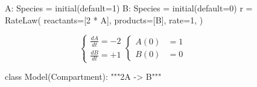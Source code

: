 \documentclass[namedate,numsec,webpdf,modern,large]{oup-authoring-template}
\theoremstyle{thmstyleone}%
\theoremstyle{thmstyletwo}%
\theoremstyle{thmstylethree}%
\newenvironment{CodeInput}{\begin{tcolorbox}[title=input,boxrule=0pt]}{\end{tcolorbox}}
\newcommand{\KeywordTok}[1]{\textcolor[rgb]{0.00,0.13,1.00}{#1}}
\newcommand{\ClassTok}[1]{\textcolor[rgb]{0.27,0.56,0.65}{#1}}
\newcommand{\OperatorTok}[1]{\textcolor[rgb]{0.00,0.00,0.00}{#1}}
\newcommand{\VariableTok}[1]{\textcolor[rgb]{0.00,0.06,0.50}{#1}}
\newcommand{\ValueTok}[1]{\textcolor[rgb]{0.13,0.57,0.41}{#1}}
\newcommand{\FunctionTok}[1]{\textcolor[rgb]{0.47,0.37,0.15}{#1}}
\newcommand{\NormalTok}[1]{\textcolor[rgb]{0.00,0.06,0.50}{#1}}
\newcommand{\CommentTok}[1]{\textcolor[rgb]{0.00,0.50,0.00}{#1}}
\begin{document}
\begin{figure}[t]
\begin{minipage}[t]{\linewidth}
\begin{minipage}[c]{0.60\linewidth}
\begin{CodeInput}
\begin{Highlighting}[]
        \VariableTok{    A}: \ClassTok{Species }\OperatorTok{=}\FunctionTok{ initial}\KeywordTok{(}\VariableTok{default}\OperatorTok{=}\ValueTok{1}\KeywordTok{)}
        \VariableTok{    B}: \ClassTok{Species }\OperatorTok{=}\FunctionTok{ initial}\KeywordTok{(}\VariableTok{default}\OperatorTok{=}\ValueTok{0}\KeywordTok{)}
        \VariableTok{    r }\OperatorTok{=}\ClassTok{ RateLaw}\KeywordTok{(}
        \VariableTok{        reactants}\OperatorTok{=}\KeywordTok{[}\ValueTok{2} \OperatorTok{*}\VariableTok{ A}\KeywordTok{]},
        \VariableTok{        products}\OperatorTok{=}\NormalTok{\KeywordTok{[}B\KeywordTok{]},}
        \VariableTok{        rate}\OperatorTok{=}\ValueTok{1}\NormalTok{,}
        \KeywordTok{    )}
      \end{Highlighting}
      \end{CodeInput}
    \end{minipage}%
    \begin{minipage}[c]{0.40\linewidth}
      \centering 
      \[
      \begin{cases}
          \frac{dA}{dt} = -2 \\
          \frac{dB}{dt} = +1
      \end{cases}
      \begin{cases}
          A(0) &= 1 \\
          B(0) &= 0
      \end{cases}
      \]
    \end{minipage}%
  \end{minipage}%
  \newline
  \begin{minipage}[t]{\linewidth}
      \centering 
      \begin{minipage}[c]{0.60\linewidth}
          \centering 
          \begin{CodeInput}
          \begin{Highlighting}[]
          \KeywordTok{class}\ClassTok{ Model}\KeywordTok{(}\ClassTok{Compartment}\KeywordTok{)}:
              \CommentTok{"""2A {-}\textgreater{} B"""}
          

\end{Highlighting}
\end{CodeInput}
\end{minipage}
\end{minipage}
\end{figure}
\end{document}
